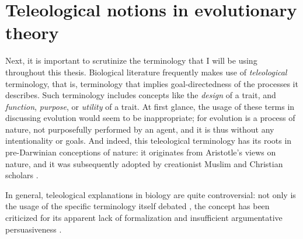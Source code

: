 \section{Teleological notions in evolutionary theory}
\label{sec:teleology}
Next, it is important to scrutinize the terminology that I will be using throughout this thesis.
Biological literature frequently makes use of \emph{teleological} terminology, that is, terminology that implies goal-directedness of the processes it describes. Such terminology includes concepts like the \emph{design} of a trait, and \emph{function}, \emph{purpose}, or \emph{utility} of a trait.
At first glance, the usage of these terms in discussing evolution would seem to be inappropriate; for evolution is a process of nature, not purposefully performed by an agent, and it is thus without any intentionality or goals.
And indeed, this teleological terminology has its roots in pre-Darwinian conceptions of nature: it originates from Aristotle's views on nature, and it was subsequently adopted by creationist Muslim and Christian scholars \citep{Johnson05}.

In general, teleological explanations in biology are quite controversial: not only is the usage of the specific terminology itself debated \citep[p.~27 and references therein]{Ayala99}, the concept has been criticized for its apparent lack of formalization and insufficient argumentative persuasiveness \citep[p.~83]{Baedke2021}.


